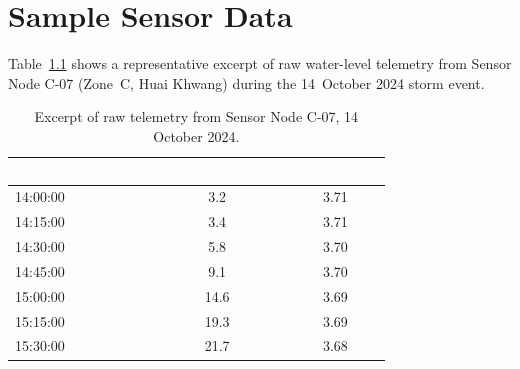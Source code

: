 \chapter{Sample Sensor Data}

Table~\ref{tab:appendixdata} shows a representative excerpt of raw water-level telemetry from Sensor Node C-07 (Zone~C, Huai Khwang) during the 14~October 2024 storm event.

\begin{table}[htbp]
\centering
\caption{Excerpt of raw telemetry from Sensor Node C-07, 14 October 2024.}
\label{tab:appendixdata}
\renewcommand{\arraystretch}{1.3}
\begin{tabular}{@{}l c c@{}}
\toprule
\rowcolor{chulapink}
\textcolor{white}{\textbf{Timestamp (ICT)}} & \textcolor{white}{\textbf{Water Level (cm)}} & \textcolor{white}{\textbf{Battery (V)}} \\
\midrule
14:00:00 & 3.2 & 3.71 \\
14:15:00 & 3.4 & 3.71 \\
14:30:00 & 5.8 & 3.70 \\
14:45:00 & 9.1 & 3.70 \\
15:00:00 & 14.6 & 3.69 \\
15:15:00 & 19.3 & 3.69 \\
15:30:00 & 21.7 & 3.68 \\
\bottomrule
\end{tabular}
\end{table}
